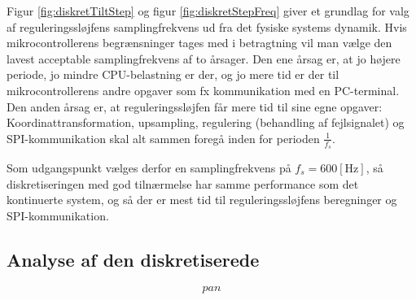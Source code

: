 Figur \ref{fig:diskretTiltStep} og figur \ref{fig:diskretStepFreq}
giver et grundlag for valg af reguleringssløjfens samplingfrekvens ud fra det fysiske systems dynamik.
Hvis mikrocontrollerens begrænsninger tages med i betragtning vil man vælge den lavest acceptable
samplingfrekvens af to årsager. Den ene årsag er, at jo højere periode, jo mindre CPU-belastning er der,
og jo mere tid er der til mikrocontrollerens andre opgaver som fx kommunikation med en PC-terminal.
Den anden årsag er, at reguleringssløjfen får mere tid til sine egne opgaver:
Koordinattransformation, upsampling, regulering (behandling af fejlsignalet) og SPI-kommunikation skal alt sammen foregå
inden for perioden \(\frac{1}{f_s}\).

Som udgangspunkt vælges derfor en samplingfrekvens på \(f_s=600 \mathrm{\left[Hz\right]}\),
så diskretiseringen med god tilnærmelse har samme performance som det kontinuerte system,
og så der er mest tid til reguleringssløjfens beregninger og SPI-kommunikation.

\subsection{Analyse af den diskretiserede}

\begin{equation}
	pan
	\label{eq:pantiltdiskretiserendetf} 
 \end{equation}
 
